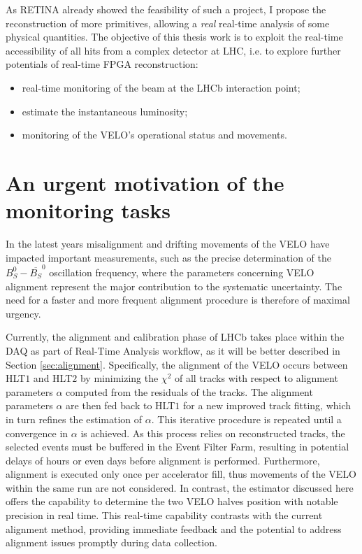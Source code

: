 As RETINA already showed the feasibility of such a project, I propose the reconstruction of more primitives, allowing a \textit{real} real-time analysis of some physical quantities. 
The objective of this thesis work is to exploit the real-time accessibility of all hits from a complex detector at LHC, i.e. to explore further potentials of real-time FPGA reconstruction: 
\begin{itemize}
\item real-time monitoring of the beam at the LHCb interaction point;
\item estimate the instantaneous luminosity;
\item monitoring of the VELO's operational status and movements.
\end{itemize}

\section{An urgent motivation of the monitoring tasks}

In the latest years misalignment and drifting movements of the VELO have impacted important measurements, such as the precise determination of the $B_S^0-\overline{B_S} ^0$ oscillation frequency, where the parameters concerning VELO alignment represent the major contribution to the systematic uncertainty\cite{b0b0soscillation}. The need for a faster and more frequent alignment procedure is therefore of maximal urgency.  
    
Currently, the alignment and calibration phase of LHCb takes place within the DAQ as part of Real-Time Analysis workflow, as it will be better described in Section \ref{sec:alignment}. Specifically, the alignment of the VELO occurs between HLT$1$ and HLT$2$ by minimizing the $\chi^2$ of all tracks with respect to alignment parameters $\alpha$ computed from the residuals of the tracks. The alignment parameters $\alpha$ are then fed back to HLT$1$ for a new improved track fitting, which in turn refines the estimation of $\alpha$. This iterative procedure is repeated until a convergence in $\alpha$ is achieved\cite{FRUHWIRTH1987444, Frühwirth:803519}. As this process relies on reconstructed tracks, the selected events must be buffered in the Event Filter Farm, resulting in potential delays of hours or even days before alignment is performed. Furthermore, alignment is executed only once per accelerator fill, thus movements of the VELO within the same run are not considered\cite{Dziurda:2640712}. In contrast, the estimator discussed here offers the capability to determine the two VELO halves position with notable precision in real time. This real-time capability contrasts with the current alignment method, providing immediate feedback and the potential to address alignment issues promptly during data collection.

